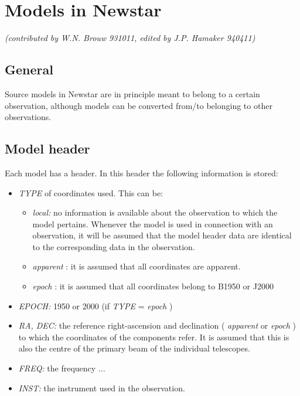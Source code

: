 
\newcommand{\NMODEL}{\textref{NMODEL}{nmodel\_descr} }
\newcommand{\local}{ {\em local} }
\newcommand{\apparent}{ {\em apparent} }
\newcommand{\epoch}{ {\em epoch} }
\newcommand{\header}{\textref{header}{.model.header} }
\newcommand{\source}{\textref{source}{.source.components} }

\chapter{ Models in Newstar}

{\it (contributed by W.N. Brouw 931011, edited by J.P. Hamaker 940411) }

\tableofcontents


\section{General}
\label{.general}

	Source models in Newstar are in principle meant to belong to a certain
observation, although models can be converted from/to belonging to other
observations.

\section{Model header}
\label{.model.header}	

	Each model has a header.  In this header the following
information is stored:

\begin{itemize}

\item	{\em TYPE}
	of coordinates used. This can be:
%
	\begin{itemize}
		\item	
		{\em local:}
		no information is available about the observation to which the
model pertains.  Whenever the model is used in connection with an
observation, it will be assumed that the model header data are identical
to the corresponding data in the observation. 
%
		\item
	 	\apparent:
		it is assumed that all coordinates are apparent.
%
		\item
		\epoch:
		it is assumed that all coordinates belong to B1950 or J2000
	\end{itemize}

\item	{\em EPOCH:} 1950 or 2000 (if {\em TYPE} = \epoch)

\item	{\em RA, DEC:}	\label{.ref.coord} 
	the reference right-ascension and declination (\apparent or
\epoch) to which the  coordinates of the \source
components refer.  It is assumed that this is also the centre of the
primary beam of the individual telescopes. 

\item	{\em FREQ:}
	the frequency ...

\item	{\em INST:}
	the instrument used in the observation.
\end{itemize}
%


